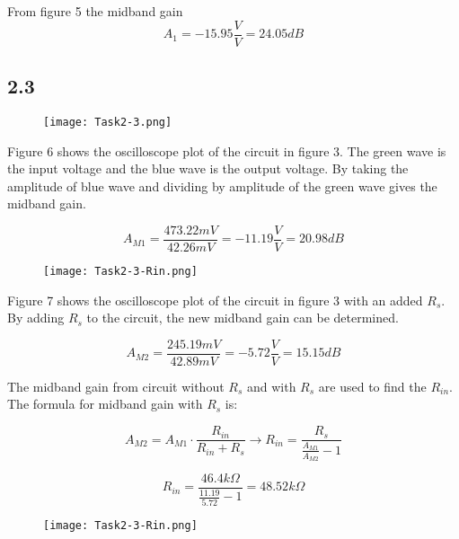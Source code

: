 From figure 5 the midband gain $$A_1 = -15.95 \frac{V}{V} = 24.05 dB $$


\pagebreak
\subsection*{2.3}

    \begin{figure}[h!]
        \centering
        \texttt{[image: Task2-3.png]}
    \end{figure}

	Figure 6 shows the oscilloscope plot of the circuit in figure 3. The green wave is the input voltage and the blue wave is the output voltage. By taking the amplitude of blue wave and dividing by amplitude of the green wave gives the midband gain.

	$$ A_{M1} = \frac{473.22 mV}{42.26 mV} = -11.19 \frac{V}{V} = 20.98 dB$$

\pagebreak

    \begin{figure}[h!]
        \centering
        \texttt{[image: Task2-3-Rin.png]}
    \end{figure}

	Figure 7 shows the oscilloscope plot of the circuit in figure 3 with an added $R_{s}$. By adding $R_{s}$ to the circuit, the new midband gain can be determined.

	$$ A_{M2} = \frac{245.19 mV}{42.89 mV} = -5.72 \frac{V}{V} = 15.15 dB$$

	The midband gain from circuit without $R_{s}$ and with $R_{s}$ are used to find the $R_{in}$. The formula for midband gain with $R_{s}$ is:  

	$$A_{M2} = A_{M1} \cdot \frac{R_{in}}{R_{in} + R_{s}} \rightarrow R_{in} = \frac{R_{s}}{\frac{A_{M1}}{A_{M2}}-1}  $$

	$$  R_{in} = \frac{46.4 k \Omega }{\frac{11.19}{5.72}-1} = 48.52 k \Omega$$ 

\pagebreak

	\begin{figure}[h!]
        \centering
        \texttt{[image: Task2-3-Rin.png]}
    \end{figure}

